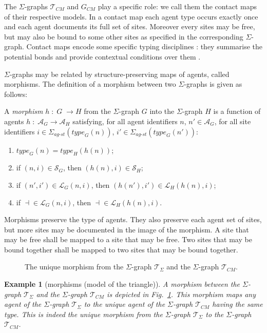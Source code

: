 \documentclass{entcs}
\newcommand{\freesymbol}{\dashv}
\newcommand{\graphsymb}{G}
\newcommand{\linksite}{\signaturesymb_{\textit{ag-st}}}
\newcommand{\signaturesymb}{\Sigma}
\newcommand{\agents}[1][\graphsymb]{\mathcal{A}_{#1}}
\newcommand{\type}[1][\graphsymb]{\textit{type}_{#1}}
\newcommand{\sites}[1][\graphsymb]{\mathcal{S}_{#1}}
\newcommand{\links}[1][\graphsymb]{\mathcal{L}_{#1}}
\newtheorem{myexample}[thm]{Example}
\begin{document}
The $\Sigma$-graphs $\mathcal{T}_{\textit{CM}}$ and $\graphsymb_{\textit{CM}}$ play a specific role: we call them the contact maps of their respective models. In a contact map each agent type occurs exactly once and each agent documents its full set of sites.  Moreover every sites may be free, but may also be bound to some other sites as specified in the corresponding $\Sigma$-graph. Contact maps encode some  specific typing disciplines \cite{DBLP:journals/mscs/DanosHW13}: they summarise the potential bonds and provide contextual conditions over them \cite{Camporesi:CMSB2013}.


$\Sigma$-graphs may be related by structure-preserving maps of agents, called morphisms. The definition of a morphism between two $\Sigma$-graphs  is given as follows:
\begin{defn}[morphisms]
 A \emph{morphism} $h\;:\;G\;\rightarrow H$ from the $\Sigma$-graph $G$ into the $\Sigma$-graph $H$ is a function of agents $h\;:\;\agents[G]\rightarrow \agents[H]$ satisfying,
for all agent identifiers $n$, $n'\in\agents[G]$, for all site identifiers $i\in\linksite(\type[G](n))$, $i'\in\linksite(\type[G](n'))$:
\begin{enumerate}
\item $\type[G](n) = \type[H](h(n))$;
\item if $(n,i)\in\sites[G]$, then $(h(n), i)\in\sites[H]$;
\item if $(n',i')\in\links[G](n,i)$, then $(h(n'),i')\in\links[H](h(n),i)$;
\item if \;$\freesymbol{ }\in\links[G](n,i)$, then \;$\freesymbol{ }\in\links[H](h(n),i)$.
\end{enumerate}
\end{defn}

Morphisms preserve the type of agents.
They also preserve each agent set of sites, but more sites may be documented in the image of the morphism. A site that may be free shall be mapped to a site that may be free. Two sites that may be bound together shall be mapped to two sites that may be bound together. %

\begin{figure}[t]
\hfill{}\hfill\mbox{}
\caption{The unique morphism from the $\Sigma$-graph $\mathcal{T}_{\Sigma}$
and the $\Sigma$-graph $\mathcal{T}_{\textit{CM}}$.}
\label{fig:abc:embed}
\end{figure}
\begin{myexample}[morphisms (model of the triangle)]
  \renewcommand{\graphsymb}{\mathcal{T}}
A morphism between the $\Sigma$-graph $\graphsymb_{\Sigma}$ and the $\Sigma$-graph $\graphsymb_{\textit{CM}}$ is depicted in Fig.~\ref{fig:abc:embed}. This morphism maps any agent of the $\Sigma$-graph
$\graphsymb_{\Sigma}$ to the unique agent of the $\Sigma$-graph $\graphsymb_{\textit{CM}}$ having the same type.
This is indeed the unique morphism from the  $\Sigma$-graph
$\graphsymb_{\Sigma}$ to the $\Sigma$-graph $\graphsymb_{\textit{CM}}$.
\end{myexample}
\end{document}
